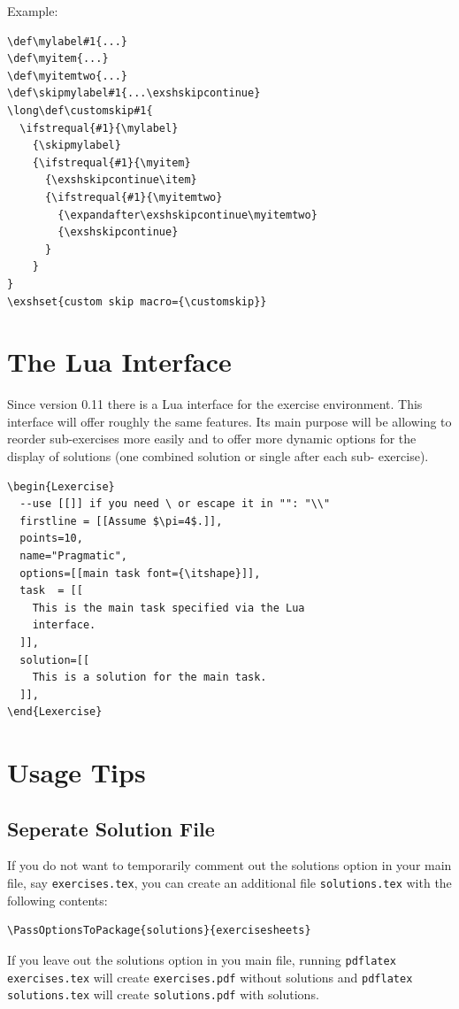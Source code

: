 \documentclass[DIV12,BCOR0mm]{scrartcl}
\newcommand{\optionstyle}{\normalfont\ttfamily\color{red!50!black}}
\newcommand{\option}[1]{{\optionstyle #1}}
\newcommand{\vers}[1]{{\normalfont\ttfamily\color{black!90} #1}}
\begin{document}
Example:
\begin{lstlisting}
\def\mylabel#1{...}
\def\myitem{...}
\def\myitemtwo{...}
\def\skipmylabel#1{...\exshskipcontinue}
\long\def\customskip#1{
  \ifstrequal{#1}{\mylabel}
    {\skipmylabel}
    {\ifstrequal{#1}{\myitem}
      {\exshskipcontinue\item}
      {\ifstrequal{#1}{\myitemtwo}
        {\expandafter\exshskipcontinue\myitemtwo}
        {\exshskipcontinue}
      }
    }
}
\exshset{custom skip macro={\customskip}}
\end{lstlisting}

\section{The Lua Interface}
\label{sec:lua}

Since version \vers{0.11} there is a Lua interface for the exercise
environment. This interface will offer roughly the same features.
Its main purpose will be allowing to reorder sub-exercises more
easily and to offer more dynamic options for the display of
solutions (one combined solution or single after each sub-%
exercise). %

\begin{lstlisting}
\begin{Lexercise}
  --use [[]] if you need \ or escape it in "": "\\"
  firstline = [[Assume $\pi=4$.]],
  points=10,
  name="Pragmatic",
  options=[[main task font={\itshape}]],
  task  = [[
    This is the main task specified via the Lua
    interface.
  ]],
  solution=[[
    This is a solution for the main task.
  ]],
\end{Lexercise}
\end{lstlisting}

\section{Usage Tips}
\label{sec:usage-tips}

\subsection{Seperate Solution File}
\label{sec:seper-solut-file}

If you do not want to temporarily comment out the \option{solutions} option in
your main file, say \texttt{exercises.tex}, you can create an additional file
\texttt{solutions.tex} with the following contents:
\begin{lstlisting}
\PassOptionsToPackage{solutions}{exercisesheets}

\end{lstlisting}
If you leave out the \option{solutions} option in you main file, running
\texttt{pdflatex exercises.tex} will create \texttt{exercises.pdf} without
solutions and \texttt{pdflatex solutions.tex} will create \texttt{solutions.pdf}
with solutions.
\end{document}
